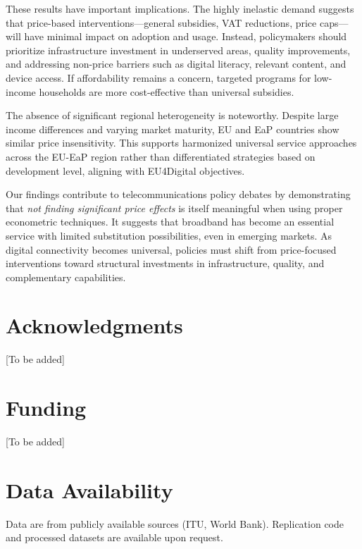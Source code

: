 \documentclass[12pt,review]{elsarticle}
\begin{document}
These results have important implications. The highly inelastic demand suggests that price-based interventions---general subsidies, VAT reductions, price caps---will have minimal impact on adoption and usage. Instead, policymakers should prioritize infrastructure investment in underserved areas, quality improvements, and addressing non-price barriers such as digital literacy, relevant content, and device access. If affordability remains a concern, targeted programs for low-income households are more cost-effective than universal subsidies.

The absence of significant regional heterogeneity is noteworthy. Despite large income differences and varying market maturity, EU and EaP countries show similar price insensitivity. This supports harmonized universal service approaches across the EU-EaP region rather than differentiated strategies based on development level, aligning with EU4Digital objectives.

Our findings contribute to telecommunications policy debates by demonstrating that \textit{not finding significant price effects} is itself meaningful when using proper econometric techniques. It suggests that broadband has become an essential service with limited substitution possibilities, even in emerging markets. As digital connectivity becomes universal, policies must shift from price-focused interventions toward structural investments in infrastructure, quality, and complementary capabilities.

\section*{Acknowledgments}
[To be added]

\section*{Funding}
[To be added]

\section*{Data Availability}
Data are from publicly available sources (ITU, World Bank). Replication code and processed datasets are available upon request.



\end{document}
